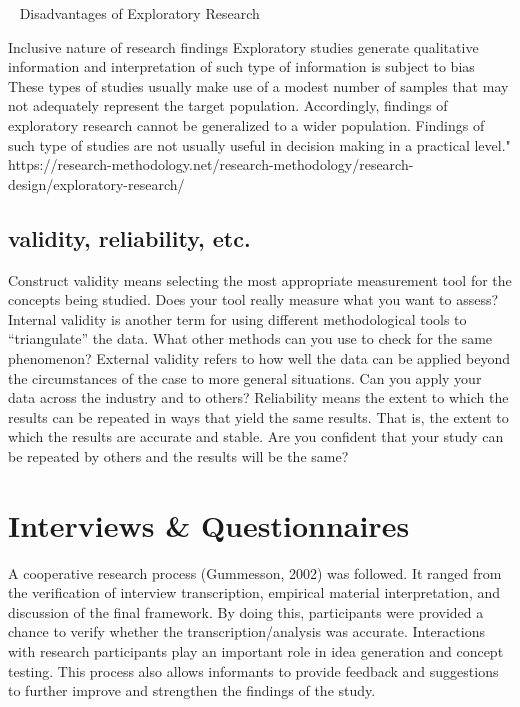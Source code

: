  
Disadvantages of Exploratory Research

    Inclusive nature of research findings
    Exploratory studies generate qualitative information and interpretation of such type of information is subject to bias
    These types of studies usually make use of a modest number of samples that may not adequately represent the target population. Accordingly, findings of exploratory research cannot be generalized to a wider population.
    Findings of such type of studies are not usually useful in decision making in a practical level."
    https://research-methodology.net/research-methodology/research-design/exploratory-research/


\subsection{validity, reliability, etc.}

Construct validity means selecting the most appropriate measurement tool for the concepts
being studied. Does your tool really measure what you want to assess?
Internal validity is another term for using different methodological tools to “triangulate” the
data. What other methods can you use to check for the same phenomenon?
External validity refers to how well the data can be applied beyond the circumstances of the
case to more general situations. Can you apply your data across the industry and to others?
Reliability means the extent to which the results can be repeated in ways that yield the same
results. That is, the extent to which the results are accurate and stable. Are you confident that
your study can be repeated by others and the results will be the same?



\section{Interviews & Questionnaires}

A cooperative research process (Gummesson, 2002) was followed. It ranged from the verification of interview transcription, empirical material interpretation, and discussion of the final framework. By doing this, participants were provided a chance to verify whether the transcription/analysis was accurate. Interactions with research participants play an important role in idea generation and concept testing. This process also allows informants to provide feedback and suggestions to further improve and strengthen the findings of the study.

